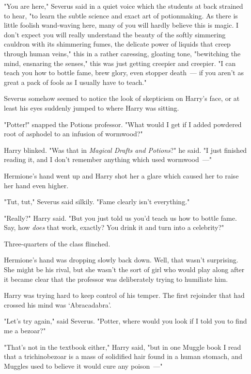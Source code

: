 "You are here," Severus said in a quiet voice which the students at back
strained to hear, "to learn the subtle science and exact art of potionmaking.
As there is little foolish wand-waving here, many of you will hardly believe
this is magic. I don't expect you will really understand the beauty of the
softly simmering cauldron with its shimmering fumes, the delicate power of
liquids that creep through human veins," this in a rather caressing, gloating
tone, "bewitching the mind, ensnaring the senses," this was just getting
creepier and creepier. "I can teach you how to bottle fame, brew glory, even
stopper death~--- if you aren't as great a pack of fools as I usually have to
teach."

Severus somehow seemed to notice the look of skepticism on Harry's face, or at
least his eyes suddenly jumped to where Harry was sitting.

"Potter!" snapped the Potions professor. "What would I get if I added powdered
root of asphodel to an infusion of wormwood?"

Harry blinked. "Was that in \emph{Magical Drafts and Potions}?" he said. "I
just finished reading it, and I don't remember anything which used wormwood~---"

Hermione's hand went up and Harry shot her a glare which caused her to raise
her hand even higher.

"Tut, tut," Severus said silkily. "Fame clearly isn't everything."

"Really?" Harry said. "But you just told us you'd teach us how to bottle fame.
Say, how \emph{does} that work, exactly? You drink it and turn into a
celebrity?"

Three-quarters of the class flinched.

Hermione's hand was dropping slowly back down. Well, that wasn't surprising.
She might be his rival, but she wasn't the sort of girl who would play along
after it became clear that the professor was deliberately trying to humiliate
him.

Harry was trying hard to keep control of his temper. The first rejoinder that
had crossed his mind was `Abracadabra'.

"Let's try again," said Severus. "Potter, where would you look if I told you to
find me a bezoar?"

"That's not in the textbook either," Harry said, "but in one Muggle book I read
that a trichinobezoar is a mass of solidified hair found in a human stomach,
and Muggles used to believe it would cure any poison~---"


